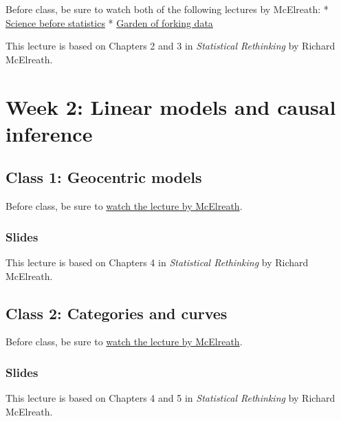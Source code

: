 \documentclass[
]{book}
\begin{document}
Before class, be sure to watch both of the following lectures by McElreath:
* \href{Science\%20Before\%20Statistics}{Science before statistics}
* \href{https://www.youtube.com/watch?v=R1vcdhPBlXA&list=PLDcUM9US4XdPz-KxHM4XHt7uUVGWWVSus&index=2}{Garden of forking data}

This lecture is based on Chapters 2 and 3 in \emph{Statistical Rethinking} by Richard McElreath.

\chapter{Week 2: Linear models and causal inference}\label{week-2-linear-models-and-causal-inference}

\section{Class 1: Geocentric models}\label{class-1-geocentric-models}

Before class, be sure to \href{https://www.youtube.com/watch?v=tNOu-SEacNU&list=PLDcUM9US4XdPz-KxHM4XHt7uUVGWWVSus&index=3}{watch the lecture by McElreath}.

\subsection{Slides}\label{slides-1}

This lecture is based on Chapters 4 in \emph{Statistical Rethinking} by Richard McElreath.

\section{Class 2: Categories and curves}\label{class-2-categories-and-curves}

Before class, be sure to \href{https://www.youtube.com/watch?v=F0N4b7K_iYQ&list=PLDcUM9US4XdPz-KxHM4XHt7uUVGWWVSus&index=4}{watch the lecture by McElreath}.

\subsection{Slides}\label{slides-2}

This lecture is based on Chapters 4 and 5 in \emph{Statistical Rethinking} by Richard McElreath.


\end{document}

